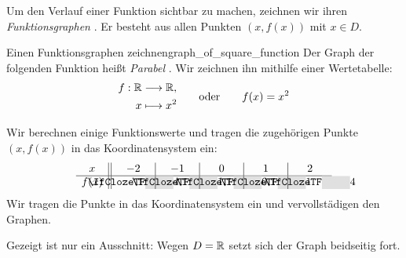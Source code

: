 \par\noindent\begin{minipage}{\linewidth}
Um den Verlauf einer Funktion sichtbar zu machen, zeichnen wir ihren
\emph{Funktionsgraphen} . Er besteht aus
allen Punkten $(x,f(x))$ mit $x\in D$.
\begin{ExampleBox}{Einen Funktionsgraphen zeichnen}{graph_of_square_function}
  Der Graph der folgenden Funktion heißt \emph{Parabel} .
  Wir zeichnen ihn mithilfe einer Wertetabelle:
  \[
      \begin{aligned}
        f:\mathbb{R} &\longrightarrow\mathbb{R},\\
        x &\longmapsto x^2
      \end{aligned}
      \qquad \text{oder} \qquad
      f(x)=x^2
  \]
  \par\smallskip
  \begin{minipage}[c]{0.5\linewidth}
    Wir berechnen einige Funktionswerte und tragen die zugehörigen Punkte
    $(x,f(x))$ in das Koordinatensystem ein:
    \[
      \begin{array}{c||*{4}{w{c}{1.05cm}|}w{c}{1.05cm}}
        x&-2&-1&0&1&2\\ \hline
        f(x)&\Cloze{0.9cm}{4}&\Cloze{0.9cm}{1}&\Cloze{0.9cm}{0}&
          \Cloze{0.9cm}{1}&\Cloze{0.9cm}{4}
      \end{array}
    \]
    Wir tragen die Punkte in das Koordinatensystem ein und vervollstädigen den Graphen.
  \end{minipage}\hfill
  \begin{minipage}[c]{0.46\linewidth}
    \centering
  \end{minipage}
  \par\smallskip
  Gezeigt ist nur ein Ausschnitt: Wegen $D=\mathbb{R}$ setzt sich der Graph beidseitig fort.
\end{ExampleBox}
\end{minipage}

